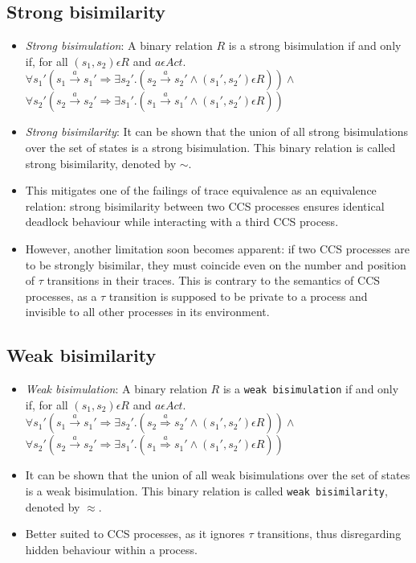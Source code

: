 \documentclass{article}
\begin{document}
\subsection{Strong bisimilarity}
  \begin{itemize}
  \item \emph{Strong bisimulation}: A binary relation $R$ is a strong
    bisimulation if and only if, for all $(s_1, s_2) \epsilon R$ and $a \epsilon Act .$\\
    $\forall s_1' (s_1 \xrightarrow{a} s_1' \Rightarrow \exists s_2'
    . (s_2 \xrightarrow{a} s_2' \wedge (s_1', s_2') \epsilon R ) )
    \wedge $ \\
    $\forall s_2' (s_2 \xrightarrow{a} s_2' \Rightarrow \exists s_1'
    . (s_1 \xrightarrow{a} s_1' \wedge (s_1', s_2') \epsilon R ) )$
  \item \emph{Strong bisimilarity}: It can be shown that the union of
    all strong bisimulations
    over the set of states is a strong bisimulation. This binary
    relation is called strong bisimilarity, denoted by $\sim$.
  \item This mitigates one of the failings of trace equivalence as an
    equivalence relation: strong bisimilarity between two CCS
    processes ensures identical deadlock behaviour while interacting
    with a third CCS process.
  \item However, another limitation soon becomes apparent: if two CCS
    processes are to be strongly bisimilar, they must coincide even on
    the number and position of $\tau$ transitions in their
    traces. This is contrary to the semantics of CCS processes, as
    a $\tau$ transition is supposed to be private to a process and
    invisible to all other processes in its environment.

  \end{itemize}

\subsection{Weak bisimilarity}

  \begin{itemize}
  \item \emph{Weak bisimulation}: A binary relation $R$ is a \texttt{weak
    bisimulation} if and only if, for all $(s_1, s_2) \epsilon R$ and
    $a \epsilon Act .$\\
    $\forall s_1' (s_1 \xrightarrow{a} s_1' \Rightarrow \exists s_2'
    . (s_2 \overset{a}{\Rightarrow} s_2' \wedge (s_1', s_2') \epsilon R ) )
    \wedge $ \\
    $\forall s_2' (s_2 \xrightarrow{a} s_2' \Rightarrow \exists s_1'
    . (s_1 \overset{a}{\Rightarrow} s_1' \wedge (s_1', s_2') \epsilon R ) )$
  \item It can be shown that the union of all weak bisimulations
    over the set of states is a weak bisimulation. This binary
    relation is called \texttt{weak bisimilarity}, denoted by $\approx$.
  \item Better suited to CCS processes,
    as it ignores $\tau$ transitions, thus disregarding hidden
    behaviour within a process.
  \end{itemize}
\end{document}
